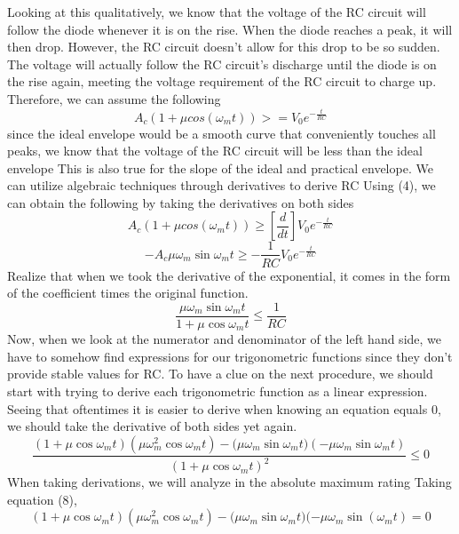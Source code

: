 Looking at this qualitatively, we know that the voltage of the RC circuit will follow the diode whenever it is on the rise. When the diode reaches a peak, it will then drop. However, the RC circuit doesn't allow for this drop to be so sudden. The voltage will actually follow the RC circuit's discharge until the diode is on the rise again, meeting the voltage requirement of the RC circuit to charge up.
Therefore, we can assume the following
\begin{equation}
    A_c(1+\mu cos(\omega_mt))>=V_0e^{-\frac{t}{RC}}
\end{equation}
since the ideal envelope would be a smooth curve that conveniently touches all peaks, we know that the voltage of the RC circuit will be less than the ideal envelope
This is also true for the slope of the ideal and practical envelope. We can utilize algebraic techniques through derivatives to derive RC
Using (4), we can obtain the following by taking the derivatives on both sides
\begin{equation}
    [\frac{d}{dt}]A_c(1+\mu cos(\omega_mt))\geq[\frac{d}{dt}]V_0e^{-\frac{t}{RC}}
\end{equation}
\begin{equation}
    -A_c\mu\omega_m\sin{\omega_mt}\geq-\frac{1}{RC}V_0e^{-\frac{t}{RC}}
\end{equation}
Realize that when we took the derivative of the exponential, it comes in the form of the coefficient times the original function.
\begin{equation}
    \frac{\mu\omega_m\sin{\omega_mt}}{1+\mu\cos{\omega_mt}}\leq\frac{1}{RC}
\end{equation}
Now, when we look at the numerator and denominator of the left hand side, we have to somehow find expressions for our trigonometric functions since they don't provide stable values for RC. To have a clue on the next procedure, we should start with trying to derive each trigonometric function as a linear expression. Seeing that oftentimes it is easier to derive when knowing an equation equals 0, we should take the derivative of both sides yet again.
\begin{equation}
    \frac{(1+\mu\cos{\omega_mt})(\mu\omega_m^2\cos{\omega_mt})-(\mu\omega_m\sin{\omega_mt)(-\mu\omega_m\sin{\omega_mt})}}{(1+\mu\cos{\omega_mt})^2}\leq0
\end{equation}
When taking derivations, we will analyze in the absolute maximum rating
Taking equation (8),
\begin{equation}
    (1+\mu\cos{\omega_mt})(\mu\omega_m^2\cos{\omega_mt})-(\mu\omega_m\sin{\omega_mt)(-\mu\omega_m\sin(\omega_mt)}=0
\end{equation}
